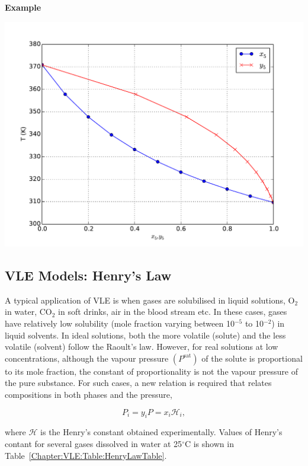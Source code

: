 \begin{MyExample}{\begin{center}{\bf Example}\end{center}}
{                   \includegraphics[width=.5\linewidth,clip]{./Figs/Mod4Ex2b}}
             
   \end{MyExample}

\subsection{VLE Models: Henry's Law}\label{Chapter:VLE:Section:HenryLaw}
A typical application of VLE is when gases are solubilised in liquid solutions, \eg O$_{2}$ in water, CO$_{2}$ in soft drinks, air in the blood stream etc. In these cases, gases have relatively low solubility (mole fraction varying between 10$^{-5}$ to 10$^{-2}$) in liquid solvents. In ideal solutions, both the more volatile (\ie solute) and the less volatile (\ie solvent) follow the Raoult’s law. However, for real solutions at low concentrations, although the vapour pressure $\left(P^{\text{sat}}\right)$ of the solute is proportional to its mole fraction, the constant of proportionality is not the vapour pressure of the pure substance. For such cases, a new relation is required that relates compositions in both phases and the pressure,
\begin{shaded}
  \begin{equation}
      P_{i} = y_{i}P = x_{i}\mathcal{H}_{i},\label{Chapter:VLE:Eqn:HenryLaw} 
  \end{equation}
\end{shaded}
\noindent where $\mathcal{H}$ is the Henry's constant obtained experimentally. Values of Henry's contant for several gases dissolved in water at 25$^{\circ}$C is shown in Table~\ref{Chapter:VLE:Table:HenryLawTable}.
